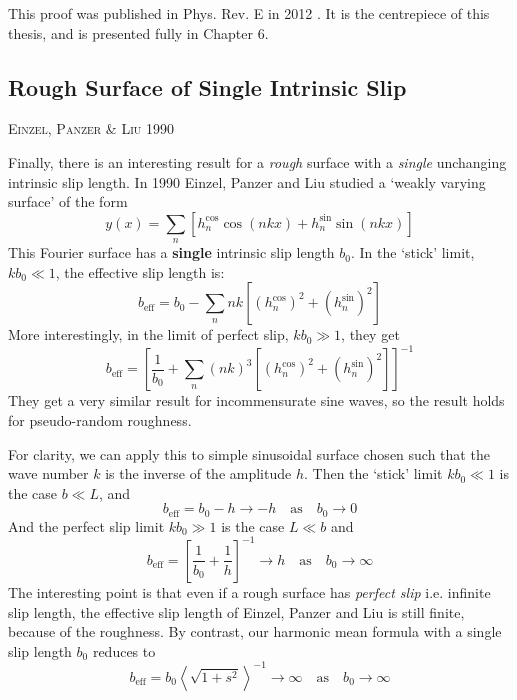 \documentclass[12pt, a4paper, twoside, openright]{book}
\newcommand{\beff}{\ensuremath{b_{\mathrm{eff}}}}
\newcommand{\paper}[1]
         {\colorbox[gray]{0.8}{ \textsc{#1}}
         
         }
\begin{document}
This proof was published in Phys. Rev. E in 2012 \cite{Lund2012}.  It is the centrepiece of this thesis, and is presented fully in Chapter 6.


\subsection{Rough Surface of Single Intrinsic Slip}

\paper{Einzel, Panzer \& Liu 1990}  %
Finally, there is an interesting result for a \emph{rough} surface with a \emph{single} unchanging intrinsic slip length.  In 1990 Einzel, Panzer and Liu \cite{EinzelPanzerLiu1990} studied a `weakly varying surface' of the form
\begin{equation}
y(x) = \sum_n \left[ h_n^{\cos} \cos(nkx) + h_n^{\sin} \sin(nkx) \right]
\end{equation} 
This Fourier surface has a \textbf{single} intrinsic slip length $b_0$.  In the `stick' limit, $kb_0 \ll 1$, the effective slip length is:
\begin{equation}
\beff = b_0 - \sum_n nk \left[ (h_n^{\cos})^2 + (h_n^{\sin})^2  \right]
\end{equation}
More interestingly, in the limit of perfect slip, $kb_0 \gg 1$, they get
\begin{equation}
\beff = \left[ \frac{1}{b_0} + \sum_n (nk)^3 \left[ (h_n^{\cos})^2 + (h_n^{\sin})^2 \right]
 \right]^{-1}
\end{equation}
They get a very similar result for incommensurate sine waves, so the result holds for pseudo-random roughness.

For clarity, we can apply this to simple sinusoidal surface chosen such that the wave number $k$ is the inverse of the amplitude $h$. Then the `stick' limit $k b_0 \ll 1$ is the case $b \ll L$, and
\begin{equation}
\beff = b_0 - h
 \to -h \quad \text{as} \quad b_0 \to 0
\end{equation} 
And the perfect slip limit $k b_0 \gg 1$ is the case $L \ll b$ and
\begin{equation}
\beff = \left[ \frac{1}{b_0} + \frac{1}{h} \right]^{-1}
 \to h \quad \text{as} \quad b_0 \to \infty
\end{equation}
The interesting point is that even if a rough surface has \emph{perfect slip} i.e. infinite slip length, the effective slip length of Einzel, Panzer and Liu is still finite, because of the roughness.
By contrast, our harmonic mean formula with a single slip length $b_0$ reduces to
\begin{equation}
\beff = b_0 \left< \sqrt{1 + s^2} \right>^{-1}
\to \infty \quad \text{as} \quad b_0 \to \infty
\end{equation}
\end{document}
